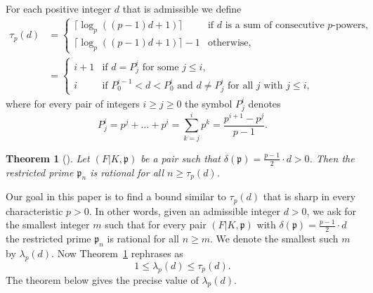 \documentclass[12pt,reqno]{amsart}%
\newtheorem{thm}[prop]{Theorem}
\theoremstyle{definition}
\newtheorem{defn}[prop]{Definition}
\theoremstyle{remark}
\newcommand{\pp}{\mathfrak{p}}
\newcommand{\de}{\delta}
\newcommand{\lam}{\lambda}
\begin{document}
For each positive integer $d$ that is admissible
we define
\begin{align*}
    \tau_p(d) &= 
    \begin{cases} 
        \lceil \log_p((p-1)d + 1) \rceil & \text{if $d$ is a sum of consecutive $p$-powers,}  \\
        \lceil \log_p((p-1)d + 1) \rceil - 1 & \text{otherwise,}
    \end{cases}
    \\
    &= 
    \begin{cases} 
        i+1 & \text{if $d=P^i_j$ for some $j \leq i$,}  \\
        i & \text{if $P^{i-1}_0 < d < P_0^i$ and $d \neq P_j^i$ for all $j$ with $j \leq i$,}
    \end{cases}
\end{align*}
where for every pair of integers $i \geq j \geq 0$ the symbol $P_j^i$ denotes 
\[ P_j^i = p^j + \dots + p^i = \sum_{k=j}^i p^k = \frac{p^{i+1} - p^j}{p-1}. \]

\begin{thm}[{\cite[Theorem~2.24]{HiSt22}}] \label{2025_05_18_14:15}
Let $(F|K,\pp)$ be a pair such that $\de(\pp) = \frac{p-1}2 {\cdot} d > 0$.
Then the restricted prime $\pp_n$ is rational for all $n \geq \tau_p (d)$.
\end{thm}

Our goal in this paper is to find a bound similar to $\tau_p(d)$ that is sharp in every characteristic $p>0$.
%
%
In other words, given an admissible integer $d>0$,
we ask for the smallest integer $m$ such that
for every pair $(F|K,\pp)$ with $\de(\pp) = \frac{p-1}2 {\cdot}d$ the restricted prime $\pp_n$ is rational for all $n \geq m$.
We denote the smallest such $m$ by $\lam_p(d)$.
Now Theorem~\ref{2025_05_18_14:15} rephrases as
\begin{equation}\label{2024_05_18_11:40}
    1 \leq \lam_p(d) \leq \tau_p(d).
\end{equation}
The theorem below gives the precise value of $\lam_p(d)$.
\end{document}
